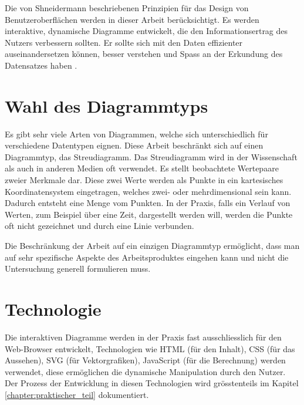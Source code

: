 Die von Shneidermann beschriebenen Prinzipien für das Design von Benutzeroberflächen werden in dieser Arbeit berücksichtigt. Es werden interaktive, dynamische Diagramme entwickelt, die den Informationsertrag des Nutzers verbessern sollten. Er sollte sich mit den Daten effizienter auseinandersetzen können, besser verstehen und Spass an der Erkundung des Datensatzes haben \cite{shneiderman}.

\section{Wahl des Diagrammtyps}

Es gibt sehr viele Arten von Diagrammen, welche sich unterschiedlich für verschiedene Datentypen eignen. Diese Arbeit beschränkt sich auf einen Diagrammtyp, das Streudiagramm. Das Streudiagramm wird in der Wissenschaft als auch in anderen Medien oft verwendet. Es stellt beobachtete Wertepaare zweier Merkmale dar. Diese zwei Werte werden als Punkte in ein kartesisches Koordinatensystem eingetragen, welches zwei- oder mehrdimensional sein kann. Dadurch entsteht eine Menge vom Punkten. In der Praxis, falls ein Verlauf von Werten, zum Beispiel über eine Zeit, dargestellt werden will, werden die Punkte oft nicht gezeichnet und durch eine Linie verbunden.

Die Beschränkung der Arbeit auf ein einzigen Diagrammtyp ermöglicht, dass man auf sehr spezifische Aspekte des Arbeitsproduktes eingehen kann und nicht die Untersuchung generell formulieren muss.

\section{Technologie}

Die interaktiven Diagramme werden in der Praxis fast ausschliesslich für den Web-Browser entwickelt, Technologien wie HTML (für den Inhalt), CSS (für das Aussehen), SVG (für Vektorgrafiken), JavaScript (für die Berechnung) werden verwendet, diese ermöglichen die dynamische Manipulation durch den Nutzer. Der Prozess der Entwicklung in diesen Technologien wird grösstenteils im Kapitel \ref{chapter:praktischer_teil} dokumentiert.
